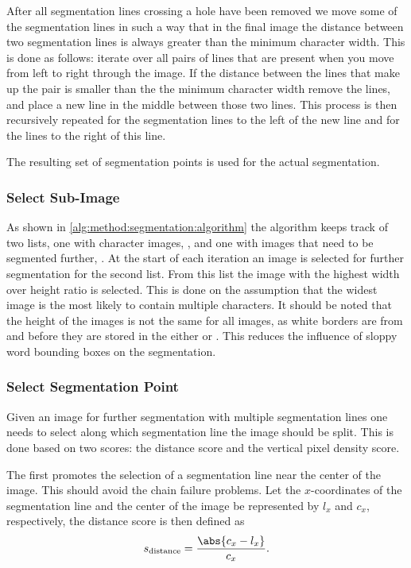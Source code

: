 	After all segmentation lines crossing a hole have been removed we move some of the segmentation lines in such a way that in the final image the distance between two segmentation lines is always greater than the minimum character width. This is done as follows: iterate over all pairs of lines that are present when you move from left to right through the image. If the distance between the lines that make up the pair is smaller than the the minimum character width remove the lines, and place a new line in the middle between those two lines. This process is then recursively repeated for the segmentation lines to the left of the new line and for the lines to the right of this line. 


	The resulting set of segmentation points is used for the actual segmentation. 

\subsubsection{Select Sub-Image}
\label{sss:method:segmentaton:selectsubimage}
As shown in \cref{alg:method:segmentation:algorithm} the algorithm keeps track of two lists, one with character images, \characters, and one with images that need to be segmented further, \segmentfurther. At the start of each iteration an image is selected for further segmentation for the second list. From this list the image with the highest width over height ratio is selected. This is done on the assumption that the widest image is the most likely to contain multiple characters. It should be noted that the height of the images is not the same for all images, as white borders are from \leftsubimage and \rightsubimage before they are stored in the either \characters or \segmentfurther. This reduces the influence of sloppy word bounding boxes on the segmentation.

\subsubsection{Select Segmentation Point}
\label{sss:method:segmentaton:selectssp}
	Given an image for further segmentation with multiple segmentation lines one needs to select along which segmentation line the image should be split. This is done based on two scores: the distance score and the vertical pixel density score. 

	The first promotes the selection of a segmentation line near the center of the image. This should avoid the chain failure problems. Let the $x$-coordinates of the segmentation line and the center of the image be represented by $l_x$ and $c_x$, respectively, the distance score is then defined as
		\begin{equation}\label{eq:method:segmenation:selectSP:distancecriterion}
			s_{\text{distance}} = \frac{\abs{c_x - l_x}}{c_x}.
		\end{equation}

